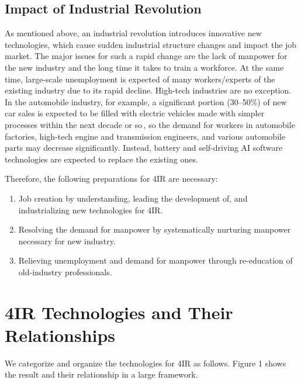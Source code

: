 \documentclass[11pt]{article}
\begin{document}
\subsection{Impact of Industrial Revolution}
As mentioned above, an industrial revolution introduces innovative new technologies, which cause sudden industrial structure changes and impact the job market. The major issues for such a rapid change are the lack of manpower for the new industry and the long time it takes to train a workforce. At the same time, large-scale unemployment is expected of many workers/experts of the existing industry due to its rapid decline. High-tech industries are no exception. In the automobile industry, for example, a significant portion (30--50\%) of new car sales is expected to be filled with electric vehicles made with simpler processes within the next decade or so\,\cite{Reuters2022,Hyundai2022}, so the demand for workers in automobile factories, high-tech engine and transmission engineers, and various automobile parts may decrease significantly. Instead, battery and self-driving AI software technologies are expected to replace the existing ones.

Therefore, the following preparations for 4IR are necessary:
\begin{enumerate}
\item Job creation by understanding, leading the development of, and industrializing new technologies for 4IR.
\item Resolving the demand for manpower by systematically nurturing manpower necessary for new industry.
\item Relieving unemployment and demand for manpower through re-education of old-industry professionals.
\end{enumerate}

\section{4IR Technologies and Their Relationships}

We categorize and organize the technologies for 4IR as follows.  Figure 1 shows the result and their relationship in a large framework.
\end{document}
